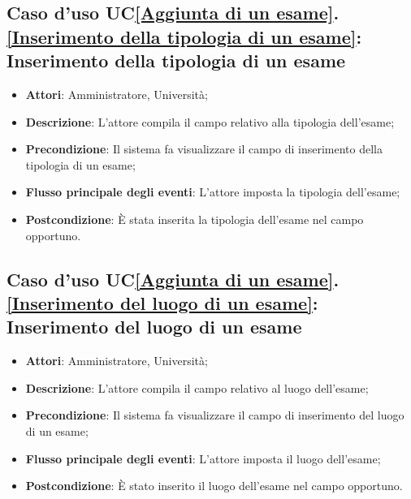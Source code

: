 \subsection{Caso d'uso UC\ref{Aggiunta di un esame}.\ref{Inserimento della tipologia di un esame}: Inserimento della tipologia di un esame}
\begin{itemize}
	\item \textbf{Attori}: Amministratore, Università;
	\item \textbf{Descrizione}: L'attore compila il campo relativo alla tipologia dell'esame;
	
	\item \textbf{Precondizione}: Il sistema fa visualizzare il campo di inserimento della tipologia di un esame;
	
	\item \textbf{Flusso principale degli eventi}: L'attore imposta la tipologia dell'esame;
	
	\item \textbf{Postcondizione}: È stata inserita la tipologia dell'esame nel campo opportuno.
	
\end{itemize}

\subsection{Caso d'uso UC\ref{Aggiunta di un esame}.\ref{Inserimento del luogo di un esame}: Inserimento del luogo di un esame}
\begin{itemize}
	\item \textbf{Attori}: Amministratore, Università;
	\item \textbf{Descrizione}: L'attore compila il campo relativo al luogo dell'esame;
	
	\item \textbf{Precondizione}: Il sistema fa visualizzare il campo di inserimento del luogo di un esame;
	
	\item \textbf{Flusso principale degli eventi}: L'attore imposta il luogo dell'esame;
	
	\item \textbf{Postcondizione}: È stato inserito il luogo dell'esame nel campo opportuno.
	
\end{itemize}


